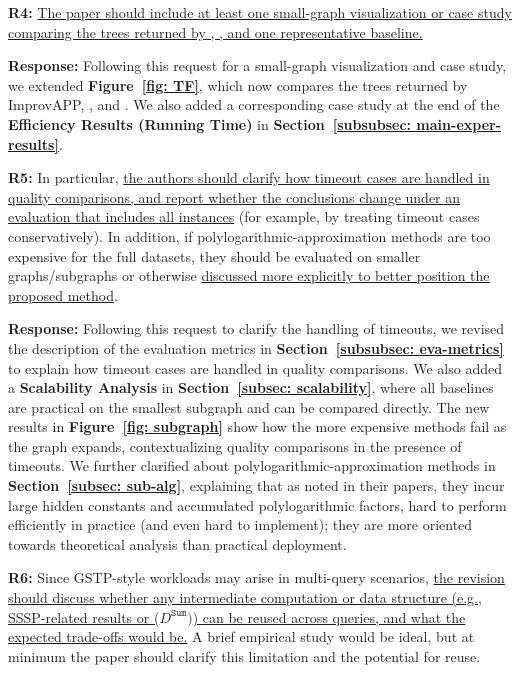 \textbf{R4:} \uline{The paper should include at least one small-graph visualization or case study comparing the trees returned by \Improved, \Basic, and one representative baseline.}

\textbf{Response:} Following this request for a small-graph visualization and case study, we extended \textbf{Figure~\ref{fig: TF}}, which now compares the trees returned by ImprovAPP, \Basic, and \Improved. We also added a corresponding case study at the end of the \textbf{Efficiency Results (Running Time)} in \textbf{Section~\ref{subsubsec: main-exper-results}}.

\textbf{R5:} In particular, \uline{the authors should clarify how timeout cases are handled in quality comparisons, and report whether the conclusions change under an evaluation that includes all instances} (for example, by treating timeout cases conservatively). In addition, if polylogarithmic-approximation methods are too expensive for the full datasets, they should be evaluated on smaller graphs/subgraphs or otherwise \uline{discussed more explicitly to better position the proposed method}.

\textbf{Response:} Following this request to clarify the handling of timeouts, we revised the description of the evaluation metrics in \textbf{Section~\ref{subsubsec: eva-metrics}} to explain how timeout cases are handled in quality comparisons. We also added a \textbf{Scalability Analysis} in \textbf{Section~\ref{subsec: scalability}}, where all baselines are practical on the smallest subgraph and can be compared directly. The new results in \textbf{Figure~\ref{fig: subgraph}} show how the more expensive methods fail as the graph expands, contextualizing quality comparisons in the presence of timeouts. We further clarified about polylogarithmic-approximation methods in \textbf{Section~\ref{subsec: sub-alg}}, explaining that as noted in their papers, they incur large hidden constants and accumulated polylogarithmic factors, hard to perform efficiently in practice (and even hard to implement); they are more oriented towards theoretical analysis than practical deployment.

\textbf{R6:} Since GSTP-style workloads may arise in multi-query scenarios, \uline{the revision should discuss whether any intermediate computation or data structure (e.g., SSSP-related results or ($D^{\mathtt{Sum}})$) can be reused across queries, and what the expected trade-offs would be.} A brief empirical study would be ideal, but at minimum the paper should clarify this limitation and the potential for reuse.

